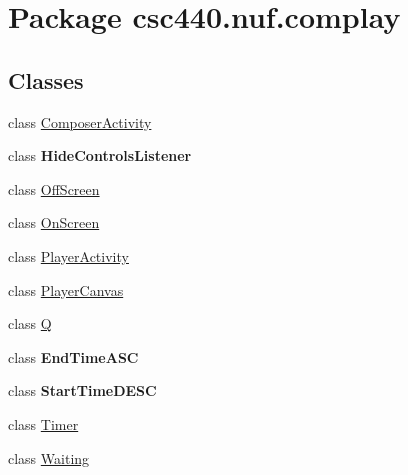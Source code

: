 \hypertarget{namespacecsc440_1_1nuf_1_1complay}{\section{Package csc440.\-nuf.\-complay}
\label{namespacecsc440_1_1nuf_1_1complay}
}
\subsection*{Classes}
\begin{DoxyCompactItemize}
\item 
class \hyperlink{classcsc440_1_1nuf_1_1complay_1_1_composer_activity}{Composer\-Activity}
\item 
class {\bfseries Hide\-Controls\-Listener}
\item 
class \hyperlink{classcsc440_1_1nuf_1_1complay_1_1_off_screen}{Off\-Screen}
\item 
class \hyperlink{classcsc440_1_1nuf_1_1complay_1_1_on_screen}{On\-Screen}
\item 
class \hyperlink{classcsc440_1_1nuf_1_1complay_1_1_player_activity}{Player\-Activity}
\item 
class \hyperlink{classcsc440_1_1nuf_1_1complay_1_1_player_canvas}{Player\-Canvas}
\item 
class \hyperlink{classcsc440_1_1nuf_1_1complay_1_1_q}{Q}
\item 
class {\bfseries End\-Time\-A\-S\-C}
\item 
class {\bfseries Start\-Time\-D\-E\-S\-C}
\item 
class \hyperlink{classcsc440_1_1nuf_1_1complay_1_1_timer}{Timer}
\item 
class \hyperlink{classcsc440_1_1nuf_1_1complay_1_1_waiting}{Waiting}
\end{DoxyCompactItemize}
